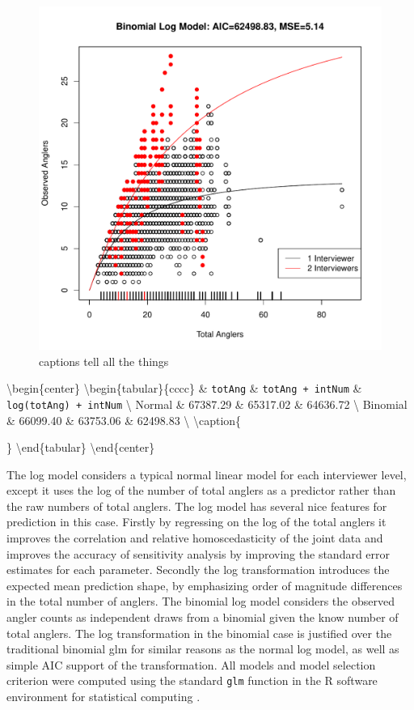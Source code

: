 \documentclass[12pt,]{article}
\begin{document}
\begin{figure}[htbp]
\centering
\includegraphics{plots/obsAngGlmLogModel.pdf}
\caption{captions tell all the things \label{obsAngLogModel}}
\end{figure}

\textbackslash{}begin\{center\}
\textbackslash{}begin\{tabular\}\{c\textbar{}c\textbar{}c\textbar{}c\textbar{}\}
\& \verb|totAng| \& \verb|totAng + intNum| \&
\verb|log(totAng) + intNum| \textbackslash{} \hline
Normal \& 67387.29 \& 65317.02 \& 64636.72 \textbackslash{} \hline
Binomial \& 66099.40 \& 63753.06 \& 62498.83 \textbackslash{} \hline
\textbackslash{}caption\{

\} \textbackslash{}end\{tabular\} \textbackslash{}end\{center\}

The log model considers a typical normal linear model for each
interviewer level, except it uses the log of the number of total anglers
as a predictor rather than the raw numbers of total anglers. The log
model has several nice features for prediction in this case. Firstly by
regressing on the log of the total anglers it improves the correlation
and relative homoscedasticity of the joint data and improves the
accuracy of sensitivity analysis by improving the standard error
estimates for each parameter. Secondly the log transformation introduces
the expected mean prediction shape, by emphasizing order of magnitude
differences in the total number of anglers. The binomial log model
considers the observed angler counts as independent draws from a
binomial given the know number of total anglers. The log transformation
in the binomial case is justified over the traditional binomial glm for
similar reasons as the normal log model, as well as simple AIC support
of the transformation. All models and model selection criterion were
computed using the standard \verb|glm| function in the R software
environment for statistical computing \cite{rBase}.
\end{document}
